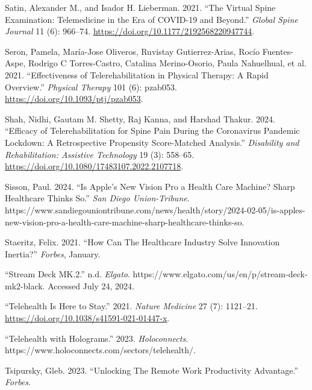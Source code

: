 \documentclass[
  letterpaper,
]{article}
\newlength{\cslhangindent}
\newenvironment{CSLReferences}[2] %
 {\begin{list}{}{%
  \setlength{\itemindent}{0pt}
  \setlength{\leftmargin}{0pt}
  \setlength{\parsep}{0pt}
  \ifodd #1
   \setlength{\leftmargin}{\cslhangindent}
   \setlength{\itemindent}{-1\cslhangindent}
  \fi
  \setlength{\itemsep}{#2\baselineskip}}}
 {\end{list}}
\begin{document}
\begin{CSLReferences}{1}{0}
Satin, Alexander M., and Isador H. Lieberman. 2021. {``The {Virtual
Spine Examination}: {Telemedicine} in the {Era} of {COVID-19} and
{Beyond}.''} \emph{Global Spine Journal} 11 (6): 966--74.
\url{https://doi.org/10.1177/2192568220947744}.

Seron, Pamela, María-Jose Oliveros, Ruvistay Gutierrez-Arias, Rocío
Fuentes-Aspe, Rodrigo C Torres-Castro, Catalina Merino-Osorio, Paula
Nahuelhual, et al. 2021. {``Effectiveness of {Telerehabilitation} in
{Physical Therapy}: {A Rapid Overview}.''} \emph{Physical Therapy} 101
(6): pzab053. \url{https://doi.org/10.1093/ptj/pzab053}.

Shah, Nidhi, Gautam M. Shetty, Raj Kanna, and Harshad Thakur. 2024.
{``Efficacy of Telerehabilitation for Spine Pain During the
{Coronavirus} Pandemic Lockdown: A Retrospective Propensity
Score-Matched Analysis.''} \emph{Disability and Rehabilitation:
Assistive Technology} 19 (3): 558--65.
\url{https://doi.org/10.1080/17483107.2022.2107718}.

Sisson, Paul. 2024. {``Is {Apple}'s New {Vision Pro} a Health Care
Machine? {Sharp Healthcare} Thinks So.''} \emph{San Diego
Union-Tribune}.
https://www.sandiegouniontribune.com/news/health/story/2024-02-05/is-apples-new-vision-pro-a-health-care-machine-sharp-healthcare-thinks-so.

Staeritz, Felix. 2021. {``How {Can The Healthcare Industry Solve
Innovation Inertia}?''} \emph{Forbes}, January.

{``Stream {Deck MK}.2.''} n.d. \emph{Elgato}.
https://www.elgato.com/us/en/p/stream-deck-mk2-black. Accessed July 24,
2024.

{``Telehealth Is Here to Stay.''} 2021. \emph{Nature Medicine} 27 (7):
1121--21. \url{https://doi.org/10.1038/s41591-021-01447-x}.

{``Telehealth with {Holograms}.''} 2023. \emph{Holoconnects}.
https://www.holoconnects.com/sectors/telehealth/.

Tsipursky, Gleb. 2023. {``Unlocking {The Remote Work Productivity
Advantage}.''} \emph{Forbes}.


\end{CSLReferences}
\end{document}
